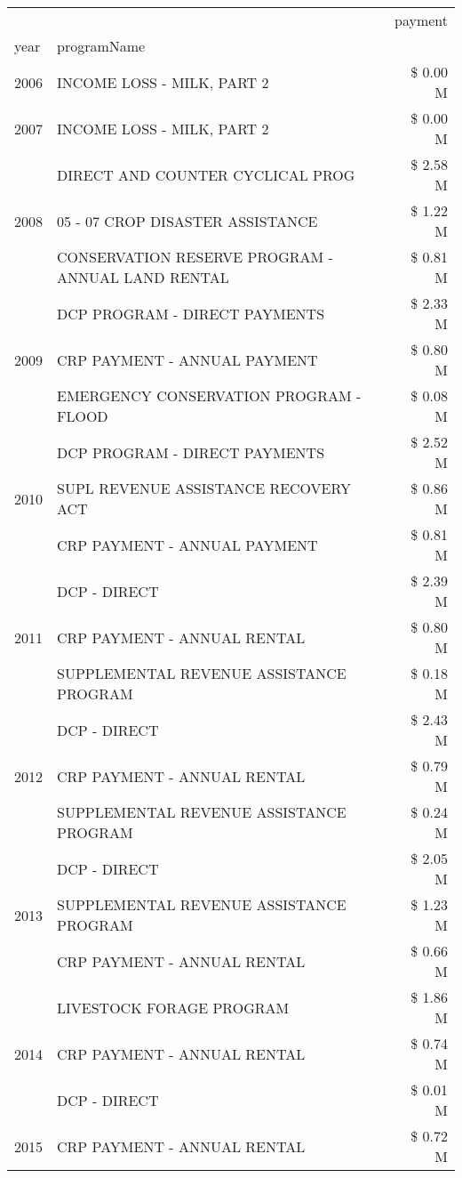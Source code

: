 \begin{tabular}{llr}
\toprule
 &  & payment \\
year & programName &  \\
\midrule
2006 & INCOME LOSS - MILK, PART 2 & \$ 0.00 M \\
\cline{1-3}
2007 & INCOME LOSS - MILK, PART 2 & \$ 0.00 M \\
\cline{1-3}
\multirow[t]{3}{*}{2008} & DIRECT AND COUNTER CYCLICAL PROG & \$ 2.58 M \\
 & 05 - 07 CROP DISASTER ASSISTANCE & \$ 1.22 M \\
 & CONSERVATION RESERVE PROGRAM - ANNUAL LAND RENTAL & \$ 0.81 M \\
\cline{1-3}
\multirow[t]{3}{*}{2009} & DCP PROGRAM - DIRECT PAYMENTS & \$ 2.33 M \\
 & CRP PAYMENT - ANNUAL PAYMENT & \$ 0.80 M \\
 & EMERGENCY CONSERVATION PROGRAM - FLOOD & \$ 0.08 M \\
\cline{1-3}
\multirow[t]{3}{*}{2010} & DCP PROGRAM - DIRECT PAYMENTS & \$ 2.52 M \\
 & SUPL REVENUE ASSISTANCE RECOVERY ACT & \$ 0.86 M \\
 & CRP PAYMENT - ANNUAL PAYMENT & \$ 0.81 M \\
\cline{1-3}
\multirow[t]{3}{*}{2011} & DCP - DIRECT & \$ 2.39 M \\
 & CRP PAYMENT - ANNUAL RENTAL & \$ 0.80 M \\
 & SUPPLEMENTAL REVENUE ASSISTANCE PROGRAM & \$ 0.18 M \\
\cline{1-3}
\multirow[t]{3}{*}{2012} & DCP - DIRECT & \$ 2.43 M \\
 & CRP PAYMENT - ANNUAL RENTAL & \$ 0.79 M \\
 & SUPPLEMENTAL REVENUE ASSISTANCE PROGRAM & \$ 0.24 M \\
\cline{1-3}
\multirow[t]{3}{*}{2013} & DCP - DIRECT & \$ 2.05 M \\
 & SUPPLEMENTAL REVENUE ASSISTANCE PROGRAM & \$ 1.23 M \\
 & CRP PAYMENT - ANNUAL RENTAL & \$ 0.66 M \\
\cline{1-3}
\multirow[t]{3}{*}{2014} & LIVESTOCK FORAGE PROGRAM & \$ 1.86 M \\
 & CRP PAYMENT - ANNUAL RENTAL & \$ 0.74 M \\
 & DCP - DIRECT & \$ 0.01 M \\
\cline{1-3}
\multirow[t]{3}{*}{2015} & CRP PAYMENT - ANNUAL RENTAL & \$ 0.72 M \\

\end{tabular}
